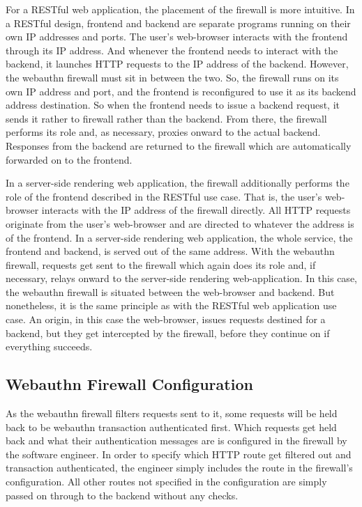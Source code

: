 
For a RESTful web application, the placement of the firewall is more intuitive. In a RESTful design, frontend and backend are separate programs running on their own IP addresses and ports. The user's web-browser interacts with the frontend through its IP address. And whenever the frontend needs to interact with the backend, it launches HTTP requests to the IP address of the backend. However, the webauthn firewall must sit in between the two. So, the firewall runs on its own IP address and port, and the frontend is reconfigured to use it as its backend address destination. So when the frontend needs to issue a backend request, it sends it rather to firewall rather than the backend. From there, the firewall performs its role and, as necessary, proxies onward to the actual backend. Responses from the backend are returned to the firewall which are automatically forwarded on to the frontend. 


In a server-side rendering web application, the firewall additionally performs the role of the frontend described in the RESTful use case. That is, the user's web-browser interacts with the IP address of the firewall directly. All HTTP requests originate from the user's web-browser and are directed to whatever the address is of the frontend. In a server-side rendering web application, the whole service, the frontend and backend, is served out of the same address. With the webauthn firewall, requests get sent to the firewall which again does its role and, if necessary, relays onward to the server-side rendering web-application. In this case, the webauthn firewall is situated between the web-browser and backend. But nonetheless, it is the same principle as with the RESTful web application use case. An origin, in this case the web-browser, issues requests destined for a backend, but they get intercepted by the firewall, before they continue on if everything succeeds.

\subsection{Webauthn Firewall Configuration}


As the webauthn firewall filters requests sent to it, some requests will be held back to be webauthn transaction authenticated first. Which requests get held back and what their authentication messages are is configured in the firewall by the software engineer. In order to specify which HTTP route get filtered out and transaction authenticated, the engineer simply includes the route in the firewall's configuration. All other routes not specified in the configuration are simply passed on through to the backend without any checks.

